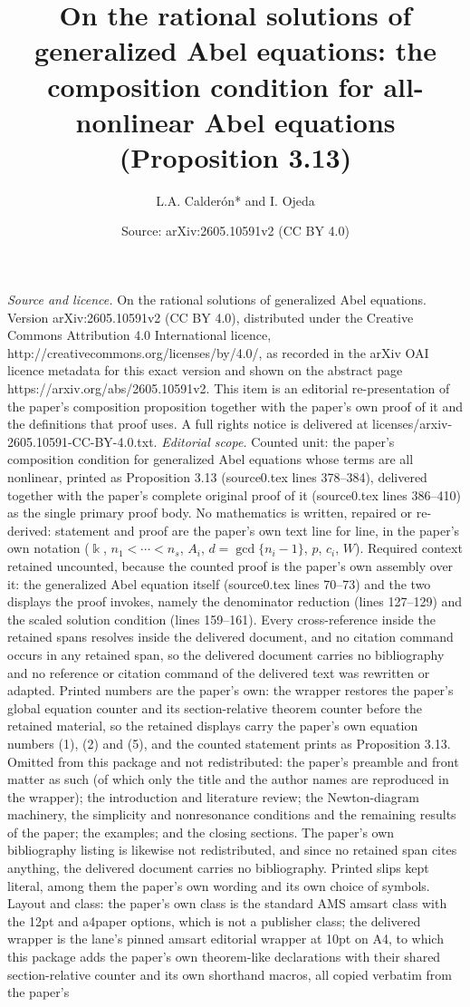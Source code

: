 \documentclass[10pt,a4paper]{amsart}
\title[On the rational solutions of generalized Abel equations]{On the rational solutions of generalized Abel equations: the composition condition for all-nonlinear Abel equations (Proposition 3.13)}
\author[L. A. Calderon and I. Ojeda]{L.A. Calderón* and I. Ojeda}
\date{Source: arXiv:2605.10591v2 (CC BY 4.0)}
\numberwithin{theorem}{section}
\theoremstyle{definition}
\begin{document}
\maketitle
\vspace{1em}
\noindent\textit{Source and licence.} On the rational solutions of generalized Abel equations. Version arXiv:2605.10591v2 (CC BY 4.0), distributed under the Creative Commons Attribution 4.0 International licence, http://creativecommons.org/licenses/by/4.0/, as recorded in the arXiv OAI licence metadata for this exact version and shown on the abstract page https://arxiv.org/abs/2605.10591v2. This item is an editorial re-presentation of the paper's composition proposition together with the paper's own proof of it and the definitions that proof uses. A full rights notice is delivered at licenses/arxiv-2605.10591-CC-BY-4.0.txt.
\noindent\textit{Editorial scope.} Counted unit: the paper's composition condition for generalized Abel equations whose terms are all nonlinear, printed as Proposition 3.13 (source0.tex lines 378--384), delivered together with the paper's complete original proof of it (source0.tex lines 386--410) as the single primary proof body. No mathematics is written, repaired or re-derived: statement and proof are the paper's own text line for line, in the paper's own notation ($\Bbbk$, $n_1<\cdots<n_s$, $A_i$, $d=\gcd\{n_i-1\}$, $p$, $c_i$, $W$). Required context retained uncounted, because the counted proof is the paper's own assembly over it: the generalized Abel equation itself (source0.tex lines 70--73) and the two displays the proof invokes, namely the denominator reduction (lines 127--129) and the scaled solution condition (lines 159--161). Every cross-reference inside the retained spans resolves inside the delivered document, and no citation command occurs in any retained span, so the delivered document carries no bibliography and no reference or citation command of the delivered text was rewritten or adapted. Printed numbers are the paper's own: the wrapper restores the paper's global equation counter and its section-relative theorem counter before the retained material, so the retained displays carry the paper's own equation numbers (1), (2) and (5), and the counted statement prints as Proposition 3.13. Omitted from this package and not redistributed: the paper's preamble and front matter as such (of which only the title and the author names are reproduced in the wrapper); the introduction and literature review; the Newton-diagram machinery, the simplicity and nonresonance conditions and the remaining results of the paper; the examples; and the closing sections. The paper's own bibliography listing is likewise not redistributed, and since no retained span cites anything, the delivered document carries no bibliography. Printed slips kept literal, among them the paper's own wording and its own choice of symbols. Layout and class: the paper's own class is the standard AMS amsart class with the 12pt and a4paper options, which is not a publisher class; the delivered wrapper is the lane's pinned amsart editorial wrapper at 10pt on A4, to which this package adds the paper's own theorem-like declarations with their shared section-relative counter and its own shorthand macros, all copied verbatim from the paper's 
\end{document}
